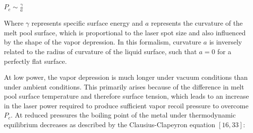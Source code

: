 \documentclass[10pt]{article}
\begin{document}
$P_{c} \sim \frac{\gamma}{a}$

Where $\gamma$ represents specific surface energy and $a$ represents the curvature of the melt pool surface, which is proportional to the laser spot size and also influenced by the shape of the vapor depression. In this formalism, curvature $a$ is inversely related to the radius of curvature of the liquid surface, such that $a=0$ for a perfectly flat surface.

At low power, the vapor depression is much longer under vacuum conditions than under ambient conditions. This primarily arises because of the difference in melt pool surface temperature and therefore surface tension, which leads to an increase in the laser power required to produce sufficient vapor recoil pressure to overcome $P_{c}$. At reduced pressures the boiling point of the metal under thermodynamic equilibrium decreases as described by the Clausius-Clapeyron equation $[16,33]:$
\end{document}
